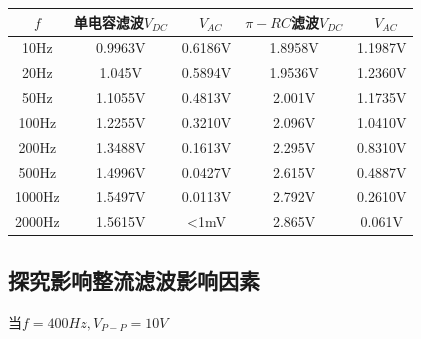 \documentclass[a4paper]{ltxdoc}
\begin{document}
\begin{tabular}{|c|c|c|c|c|}
    \hline \textbf{$f$} & \textbf{单电容滤波$V_{DC}$} & \textbf{~$V_{AC}$} & \textbf{$\pi - RC$滤波$V_{DC}$} & \textbf{~$V_{AC}$} \\
    \hline 10Hz         & 0.9963V                     & 0.6186V            & 1.8958V                         & 1.1987V            \\
    \hline 20Hz         & 1.045V                      & 0.5894V            & 1.9536V                         & 1.2360V            \\
    \hline 50Hz         & 1.1055V                     & 0.4813V            & 2.001V                          & 1.1735V            \\
    \hline 100Hz        & 1.2255V                     & 0.3210V            & 2.096V                          & 1.0410V            \\
    \hline 200Hz        & 1.3488V                     & 0.1613V            & 2.295V                          & 0.8310V            \\
    \hline 500Hz        & 1.4996V                     & 0.0427V            & 2.615V                          & 0.4887V            \\
    \hline 1000Hz       & 1.5497V                     & 0.0113V            & 2.792V                          & 0.2610V            \\
    \hline 2000Hz       & 1.5615V                     & <1mV               & 2.865V                          & 0.061V             \\\hline
\end{tabular}

\subsection{探究影响整流滤波影响因素}
当$f=400Hz,V_{P-P}=10V$
\end{document}
